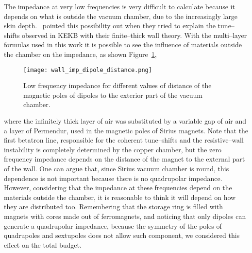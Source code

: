     The impedance at very low frequencies is very difficult to calculate because it depends on what is outside the vacuum chamber, due to the increasingly large skin depth.~ pointed this possibility out when they tried to explain the tune--shifts observed in KEKB with their finite--thick wall theory. With the multi--layer formulas used in this work it is possible to see the influence of materials outside the chamber on the impedance, as shown Figure~\ref{fig:wall_imp_dipole_distance},
    \begin{figure}
        \centering
        \texttt{[image: wall\_imp\_dipole\_distance.png]}
        \caption{Low frequency impedance for different values of distance of the magnetic poles of dipoles to the exterior part of the vacuum chamber.}
        \label{fig:wall_imp_dipole_distance}
    \end{figure}
    where the infinitely thick layer of air was substituted by a variable gap of air and a layer of Permendur, used in the magnetic poles of Sirius magnets. Note that the first betatron line, responsible for the coherent tune--shifts and the resistive--wall instability is completely determined by the copper chamber, but the zero frequency impedance depends on the distance of the magnet to the external part of the wall. One can argue that, since Sirius vacuum chamber is round, this dependence is not important because there is no quadrupolar impedance. However, considering that the impedance at these frequencies depend on the materials outside the chamber, it is reasonable to think it will depend on how they are distributed too. Remembering that the storage ring is filled with magnets with cores made out of ferromagnets, and noticing that only dipoles can generate a quadrupolar impedance, because the symmetry of the poles of quadrupoles and sextupoles does not allow such component, we considered this effect on the total budget.

